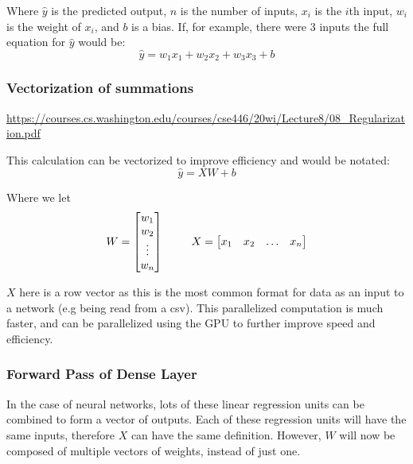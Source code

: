 \documentclass{article}
\begin{document}
    Where $\hat{y}$ is the predicted output, $n$ is the number of inputs, $x_i$ is the $i$th input, $w_i$ is the weight of $x_i$, and $b$ is a bias.
    If, for example, there were 3 inputs the full equation for $\hat{y}$ would be:
    \begin{displaymath}
        \hat{y} = w_1x_1 + w_2x_2 + w_3x_3 + b
    \end{displaymath}

    \subsubsection{Vectorization of summations}
    \noindent \url{https://courses.cs.washington.edu/courses/cse446/20wi/Lecture8/08_Regularization.pdf}

    This calculation can be vectorized to improve efficiency and would be notated:
    \begin{displaymath}
        \hat{y} = XW + b
    \end{displaymath}

    Where we let
    \begin{displaymath}
        W = \begin{bmatrix}
            w_1\\
            w_2\\
            \vdots\\
            w_n
        \end{bmatrix}\\
        \hspace{25px}
        X = \begin{bmatrix}
            x_1&
            x_2&
            \hdots&
            x_n
        \end{bmatrix}
    \end{displaymath}

    $X$ here is a row vector as this is the most common format for data as an input to a network (e.g being read from a csv).
    This parallelized computation is much faster, and can be parallelized using the GPU to further improve speed and efficiency.

    \subsubsection{Forward Pass of Dense Layer}
    In the case of neural networks, lots of these linear regression units can be combined to form a vector of outputs.
    Each of these regression units will have the same inputs, therefore $X$ can have the same definition. However, $W$ will now be
    composed of multiple vectors of weights, instead of just one.
\end{document}
